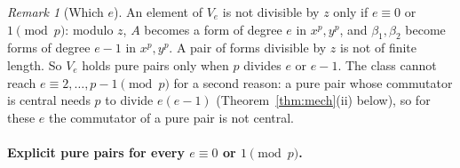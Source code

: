 \documentclass[11pt]{article}
\theoremstyle{definition}
\theoremstyle{remark}
\newtheorem{remark}{Remark}
\begin{document}
\begin{remark}[Which $e$]\label{rem:whiche}
An element of $V_e$ is not divisible by $z$ only if $e\equiv0$ or $1\pmod p$: modulo $z$, $A$ becomes a form of degree $e$ in $x^p,y^p$, and $\beta_1,\beta_2$ become forms of degree $e-1$ in $x^p,y^p$. A pair of forms divisible by $z$ is not of finite length. So $V_e$ holds pure pairs only when $p$ divides $e$ or $e-1$. The class cannot reach $e\equiv2,\dots,p-1\pmod p$ for a second reason: a pure pair whose commutator is central needs $p$ to divide $e(e-1)$ (Theorem~\ref{thm:mech}(ii) below), so for these $e$ the commutator of a pure pair is not central.
\end{remark}

\paragraph{Explicit pure pairs for every $e\equiv0$ or $1\pmod p$.}
\end{document}
